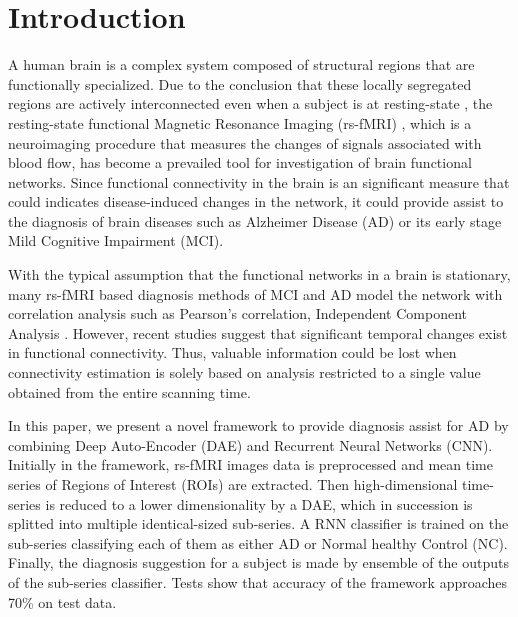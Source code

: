 \section{Introduction}

A human brain is a complex system composed of structural regions that are functionally specialized. Due to the conclusion that these locally segregated regions are actively interconnected even when a subject is at resting-state \cite{biswal95}, the resting-state functional Magnetic Resonance Imaging (rs-fMRI) , which is a neuroimaging procedure that measures the changes of signals associated with blood flow, has become a prevailed tool for investigation of brain functional networks. Since functional connectivity in the brain is an significant measure that could indicates disease-induced changes in the network, it could provide assist to the diagnosis of brain diseases such as Alzheimer Disease (AD) or its early stage Mild Cognitive Impairment (MCI).

With the typical assumption that the functional networks in a brain is stationary, many rs-fMRI based diagnosis methods of MCI and AD model the network with correlation analysis such as Pearson’s correlation, Independent Component Analysis \cite{li12}. However, recent studies \cite{hutch13} suggest that significant temporal changes exist in functional connectivity. Thus, valuable information could be lost when connectivity estimation is solely based on analysis restricted to a single value obtained from the entire scanning time.

In this paper, we present a novel framework to provide diagnosis assist for AD by combining Deep Auto-Encoder (DAE) and Recurrent Neural Networks (CNN).  Initially in the framework, rs-fMRI images data is preprocessed and mean time series of Regions of Interest (ROIs) are extracted. Then high-dimensional time-series is reduced to a lower dimensionality by a DAE, which in succession is splitted into multiple identical-sized sub-series. A RNN classifier is trained on the sub-series classifying each of them as either AD or Normal healthy Control (NC). Finally, the diagnosis suggestion for a subject is made by ensemble of the outputs of the sub-series classifier. Tests show that accuracy of the framework approaches 70\% on test data.